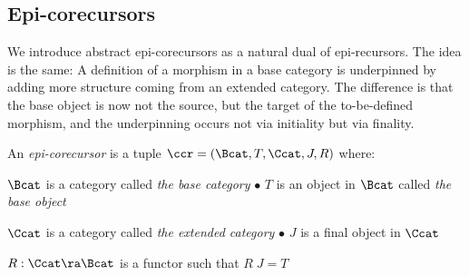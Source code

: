 



\vspace*{-0.5ex}\subsection{Epi-corecursors}
\label{subsec-epicoRec}


We introduce abstract epi-corecursors as a natural dual of epi-recursors. The idea is the same: 
A definition of a morphism in a base category is underpinned by adding more structure coming from an extended category. The difference is that the base object %
is now not the source, but the target of the to-be-defined morphism, and the underpinning %
occurs not via initiality but via finality. 



\begin{defi} \rm \label{defi-epicorec}
	An \emph{epi-corecursor} is a tuple $\ccr = (\Bcat,T,\Ccat,J,R)$ where:
	\begin{mmyitem} 
		\item $\Bcat$ is a category called \emph{the base category}
			\hspace*{9ex} 
		$\bullet$ $T$ is an object in $\Bcat$ called \emph{the base object}
		\item $\Ccat$ is a category called \emph{the extended category}
			\hspace*{5.12ex} 
		$\bullet$ $J$ is a final object in $\Ccat$
		\item $R : \Ccat \ra \Bcat$  is a functor such that $R\;J = T$   
	\end{mmyitem}
\end{defi}
%

